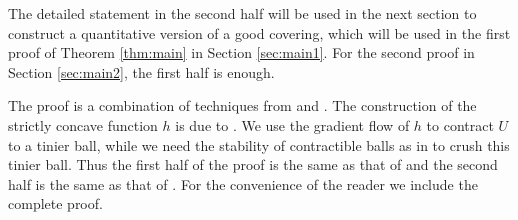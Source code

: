 \documentclass[a4paper,12pt]{amsart}
\theoremstyle{plain}
\theoremstyle{definition}
\numberwithin{thm}{section}
\numberwithin{equation}{section}
\begin{document}
The detailed statement in the second half will be used in the next section to construct a quantitative version of a good covering, which will be used in the first proof of Theorem \ref{thm:main} in Section \ref{sec:main1}.
For the second proof in Section \ref{sec:main2}, the first half is enough.

The proof is a combination of techniques from \cite[4.3]{PP:ext} and \cite[1.2]{MY:stab}.
The construction of the strictly concave function $h$ is due to \cite[4.3]{PP:ext}.
We use the gradient flow of $h$ to contract $U$ to a tinier ball, while we need the stability of contractible balls as in \cite[1.2]{MY:stab} to crush this tinier ball.
Thus the first half of the proof is the same as that of \cite[4.3]{PP:ext} and the second half is the same as that of \cite[1.2]{MY:stab}.
For the convenience of the reader we include the complete proof.
\end{document}
